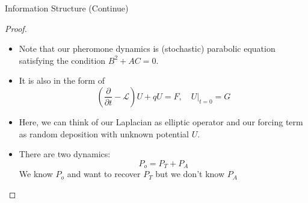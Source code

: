 \documentclass[10pt]{beamer}
\begin{document}
\begin{frame}{Information Structure (Continue)}
    \begin{proof}
        \begin{itemize}
        \item Note that our pheromone dynamics is (stochastic) parabolic equation satisfying the condition $B^2 + AC = 0$.
        \item It is also in the form of
        \begin{equation}
        \left(\dfrac{\partial}{\partial t}-\mathcal{L}\right) U + qU = F, \quad \left.U\right|_{t=0} = G    
        \end{equation}
        \item Here, we can think of our Laplacian as elliptic operator and our forcing term as random deposition with unknown potential $U$.
        \item There are two dynamics:
        \[
        P_o = P_T + P_A
        \]
        We know $P_o$ and want to recover $P_T$ but we don't know $P_A$
    \end{itemize}
    \end{proof}
    \end{frame}
\end{document}
